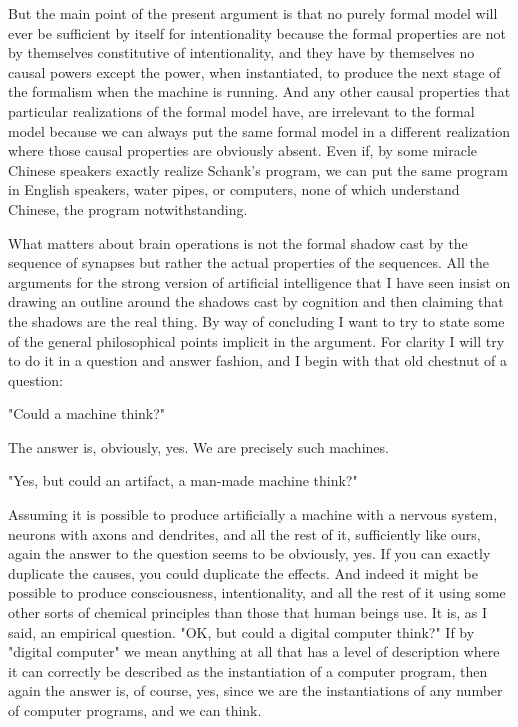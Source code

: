 But the main point of the present argument is that no purely formal model will ever be sufficient by itself for
intentionality because the formal properties are not by themselves constitutive of intentionality, and they have by
themselves no causal powers except the power, when instantiated, to produce the next stage of the formalism
when the machine is running. And any other causal properties that particular realizations of the formal model
have, are irrelevant to the formal model because we can always put the same formal model in a different
realization where those causal properties are obviously absent. Even if, by some miracle Chinese speakers
exactly realize Schank's program, we can put the same program in English speakers, water pipes, or
computers, none of which understand Chinese, the program notwithstanding.

What matters about brain operations is not the formal shadow cast by the sequence of synapses but rather the
actual properties of the sequences. All the arguments for the strong version of artificial intelligence that I have
seen insist on drawing an outline around the shadows cast by cognition and then claiming that the shadows are
the real thing. By way of concluding I want to try to state some of the general philosophical points implicit in the
argument. For clarity I will try to do it in a question and answer fashion, and I begin with that old chestnut of a
question:

"Could a machine think?"

The answer is, obviously, yes. We are precisely such machines.

"Yes, but could an artifact, a man-made machine think?"

Assuming it is possible to produce artificially a machine with a nervous system, neurons with axons and
dendrites, and all the rest of it, sufficiently like ours, again the answer to the question seems to be obviously, yes.
If you can exactly duplicate the causes, you could duplicate the effects. And indeed it might be possible to
produce consciousness, intentionality, and all the rest of it using some other sorts of chemical principles than
those that human beings use. It is, as I said, an empirical question. "OK, but could a digital computer think?"
If by "digital computer" we mean anything at all that has a level of description where it can correctly be
described as the instantiation of a computer program, then again the answer is, of course, yes, since we are the
instantiations of any number of computer programs, and we can think.

